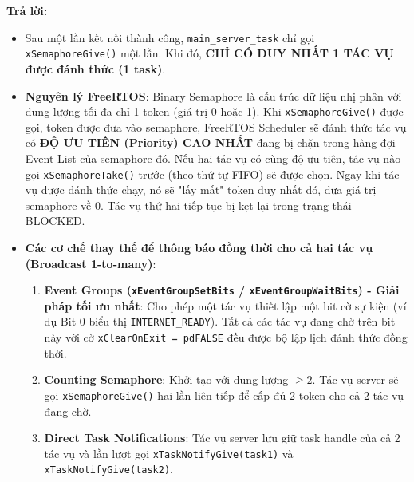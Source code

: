 \begin{tcolorbox}[colback=blue!3,colframe=blue!75!black,title=\textbf{Câu hỏi 4: Hai tác vụ cùng gọi xSemaphoreTake() trên xBinarySemaphoreInternet. Sau một lần kết nối thành công, có bao nhiêu tác vụ được đánh thức? Bạn sẽ dùng cơ chế nào thay thế nếu cả hai đều phải được thông báo?}]
\textbf{Trả lời:}
\begin{itemize}[leftmargin=*]
    \item Sau một lần kết nối thành công, \texttt{main\_server\_task} chỉ gọi \texttt{xSemaphoreGive()} một lần. Khi đó, \textbf{CHỈ CÓ DUY NHẤT 1 TÁC VỤ được đánh thức (1 task)}.
    \item \textbf{Nguyên lý FreeRTOS}: Binary Semaphore là cấu trúc dữ liệu nhị phân với dung lượng tối đa chỉ 1 token (giá trị 0 hoặc 1). Khi \texttt{xSemaphoreGive()} được gọi, token được đưa vào semaphore, FreeRTOS Scheduler sẽ đánh thức tác vụ có \textbf{ĐỘ ƯU TIÊN (Priority) CAO NHẤT} đang bị chặn trong hàng đợi Event List của semaphore đó. Nếu hai tác vụ có cùng độ ưu tiên, tác vụ nào gọi \texttt{xSemaphoreTake()} trước (theo thứ tự FIFO) sẽ được chọn. Ngay khi tác vụ được đánh thức chạy, nó sẽ "lấy mất" token duy nhất đó, đưa giá trị semaphore về 0. Tác vụ thứ hai tiếp tục bị kẹt lại trong trạng thái BLOCKED.
    \item \textbf{Các cơ chế thay thế để thông báo đồng thời cho cả hai tác vụ (Broadcast 1-to-many)}:
    \begin{enumerate}
        \item \textbf{Event Groups (\texttt{xEventGroupSetBits} / \texttt{xEventGroupWaitBits}) - Giải pháp tối ưu nhất}: Cho phép một tác vụ thiết lập một bit cờ sự kiện (ví dụ Bit 0 biểu thị \texttt{INTERNET\_READY}). Tất cả các tác vụ đang chờ trên bit này với cờ \texttt{xClearOnExit = pdFALSE} đều được bộ lập lịch đánh thức đồng thời.
        \item \textbf{Counting Semaphore}: Khởi tạo với dung lượng $\ge 2$. Tác vụ server sẽ gọi \texttt{xSemaphoreGive()} hai lần liên tiếp để cấp đủ 2 token cho cả 2 tác vụ đang chờ.
        \item \textbf{Direct Task Notifications}: Tác vụ server lưu giữ task handle của cả 2 tác vụ và lần lượt gọi \texttt{xTaskNotifyGive(task1)} và \texttt{xTaskNotifyGive(task2)}.
    \end{enumerate}
\end{itemize}
\end{tcolorbox}

\newpage

